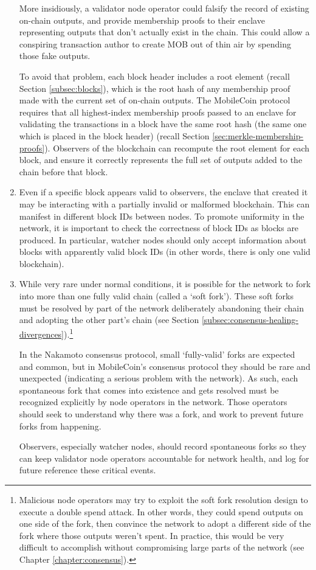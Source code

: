\begin{enumerate}
    More insidiously, a validator node operator could falsify the record of existing on-chain outputs, and provide membership proofs to their enclave representing outputs that don't actually exist in the chain. This could allow a conspiring transaction author to create MOB out of thin air by spending those fake outputs.

    To avoid that problem, each block header includes a root element (recall Section \ref{subsec:blocks}), which is the root hash of any membership proof made with the current set of on-chain outputs. The MobileCoin protocol requires that all highest-index membership proofs passed to an enclave for validating the transactions in a block have the same root hash (the same one which is placed in the block header) (recall Section \ref{sec:merkle-membership-proofs}). Observers of the blockchain can recompute the root element for each block, and ensure it correctly represents the full set of outputs added to the chain before that block.

    \item Even if a specific block appears valid to observers, the enclave that created it may be interacting with a partially invalid or malformed blockchain. This can manifest in different block IDs between nodes. To promote uniformity in the network, it is important to check the correctness of block IDs as blocks are produced. In particular, watcher nodes should only accept information about blocks with apparently valid block IDs (in other words, there is only one valid blockchain).

    \item While very rare under normal conditions, it is possible for the network to fork into more than one fully valid chain (called a `soft fork'). These soft forks must be resolved by part of the network deliberately abandoning their chain and adopting the other part's chain (see Section \ref{subsec:consensus-healing-divergences}).\footnote{Malicious node operators may try to exploit the soft fork resolution design to execute a double spend attack. In other words, they could spend outputs on one side of the fork, then convince the network to adopt a different side of the fork where those outputs weren't spent. In practice, this would be very difficult to accomplish without compromising large parts of the network (see Chapter \ref{chapter:consensus}).}

    In the Nakamoto consensus protocol, small `fully-valid' forks are expected and common, but in MobileCoin's consensus protocol they should be rare and unexpected (indicating a serious problem with the network). As such, each spontaneous fork that comes into existence and gets resolved must be recognized explicitly by node operators in the network. Those operators should seek to understand why there was a fork, and work to prevent future forks from happening.

    Observers, especially watcher nodes, should record spontaneous forks so they can keep validator node operators accountable for network health, and log for future reference these critical events.
\end{enumerate}

